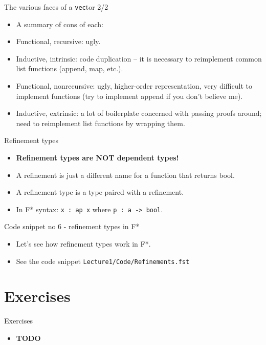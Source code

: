\documentclass{beamer}
\newcommand{\m}[1]{\texttt{#1}}
\begin{document}
\begin{frame}{The various faces of a \m{vec}tor 2/2}
\begin{itemize}
	\item A summary of cons of each:
	\item Functional, recursive: ugly.
	\item Inductive, intrinsic: code duplication -- it is necessary to reimplement common list functions (append, map, etc.).
    \item Functional, nonrecursive: ugly, higher-order representation, very difficult to implement functions (try to implement append if you don't believe me).
    \item Inductive, extrinsic: a lot of boilerplate concerned with passing proofs around; need to reimplement list functions by wrapping them.
\end{itemize}
\end{frame}

\begin{frame}{Refinement types}
\begin{itemize}
    \item \textbf{Refinement types are NOT dependent types!}
    \item A refinement is just a different name for a function that returns bool.
    \item A refinement type is a type paired with a refinement.
    \item In F* syntax: \m{x : a{p x}} where \m{p : a -> bool}.
\end{itemize}
\end{frame}

\begin{frame}{Code snippet no 6 - refinement types in F*}
\begin{itemize}
	\item Let's see how refinement types work in F*.
	\item See the code snippet \m{Lecture1/Code/Refinements.fst}
\end{itemize}
\end{frame}

\section{Exercises}

\begin{frame}{Exercises}
\begin{itemize}
	\item \textbf{TODO}
\end{itemize}
\end{frame}
\end{document}
